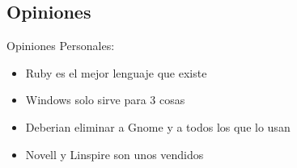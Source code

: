 \subsection{Opiniones}

\begin{frame}{Opiniones Personales:\newline}

\begin{itemize}
	
	\item Ruby es el mejor lenguaje que existe
	\item Windows solo sirve para 3 cosas
	\item Deberian eliminar a Gnome y a todos los que lo usan
	\item Novell y Linspire son unos vendidos
	
\end{itemize}

\end{frame}
